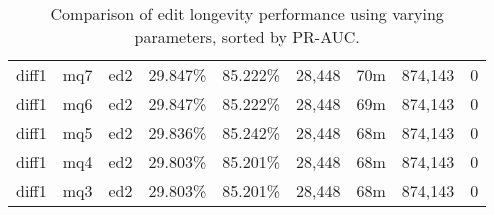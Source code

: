 \begin{sidewaystable}[!ph]
\begin{center}
\begin{tabular}{|c|c|c||c|c||c|c|c|c|}
diff1 & mq7 & ed2 & 29.847\% & 85.222\% & 28,448 & 70m & 874,143 & 0 \\
diff1 & mq6 & ed2 & 29.847\% & 85.222\% & 28,448 & 69m & 874,143 & 0 \\
diff1 & mq5 & ed2 & 29.836\% & 85.242\% & 28,448 & 68m & 874,143 & 0 \\
diff1 & mq4 & ed2 & 29.803\% & 85.201\% & 28,448 & 68m & 874,143 & 0 \\
diff1 & mq3 & ed2 & 29.803\% & 85.201\% & 28,448 & 68m & 874,143 & 0 \\
\hline
\end{tabular}
\end{center}
\caption{Comparison of edit longevity performance using
    varying parameters, sorted by PR-AUC.}
\label{tab:editshoutI}
\end{sidewaystable}
\clearpage
